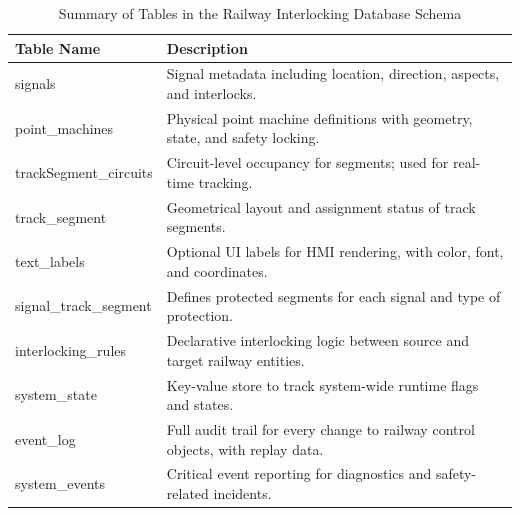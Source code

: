 \begin{table}[H]
    \centering
    \renewcommand{\arraystretch}{1.3}
    \caption{Summary of Tables in the Railway Interlocking Database Schema}
    \begin{tabular}{|p{4.5cm}|p{10.2cm}|}
        \hline
        \textbf{Table Name} & \textbf{Description} \\ \hline
        signals & Signal metadata including location, direction, aspects, and interlocks. \\ \hline
        point\_machines & Physical point machine definitions with geometry, state, and safety locking. \\ \hline
        trackSegment\_circuits & Circuit-level occupancy for segments; used for real-time tracking. \\ \hline
        track\_segment & Geometrical layout and assignment status of track segments. \\ \hline
        text\_labels & Optional UI labels for HMI rendering, with color, font, and coordinates. \\ \hline
        signal\_track\_segment & Defines protected segments for each signal and type of protection. \\ \hline
        interlocking\_rules & Declarative interlocking logic between source and target railway entities. \\ \hline
        system\_state & Key-value store to track system-wide runtime flags and states. \\ \hline
        event\_log & Full audit trail for every change to railway control objects, with replay data. \\ \hline
        system\_events & Critical event reporting for diagnostics and safety-related incidents. \\ \hline
        
    \end{tabular}
    
    \label{tab:railway-schema}
\end{table}
